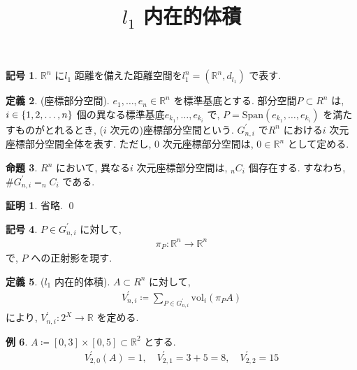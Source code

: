 \documentclass[10pt, fleqn, label-section=none]{bxjsarticle}
\title{$l_1$ 内在的体積}
\date{}
\author{}
\theoremstyle{definition}
\newtheorem{dfn}{定義}[section]
\newtheorem{ex}[dfn]{例}
\newtheorem{prop}[dfn]{命題}
\newtheorem{notation}[dfn]{記号}
\newtheorem*{pf*}{証明}
\newcommand{\cbra}[1]{\mleft\{#1\mright\}}
\newcommand{\vol}{\textrm{vol}}
\renewcommand{\;}{\, ; \,}
\newcommand{\Span}{\textrm{Span}}
\begin{document}
\maketitle

\section{}

\begin{notation}$\mathbb R^n$ に$l_1$ 距離を備えた距離空間を$l^n_1 = (\mathbb R^n, d_{l_1})$ で表す. 

\end{notation}

\begin{dfn}(座標部分空間). $e_1, \ldots, e_n \in \mathbb R^n$ を標準基底とする. 部分空間$P \subset R^n$ は, $i \in \cbra{1, 2, \ldots, n}$ 個の異なる標準基底$e_{k_1} , \ldots , e_{k_i}$ で, $P = \Span (e_{k_1} , \ldots , e_{k_i}) $ を満たすものがとれるとき, ($i$ 次元の)座標部分空間という. $G^\prime _{n, i}$ で$R^n$ における$i$ 次元座標部分空間全体を表す. ただし, $0$ 次元座標部分空間は, $0 \in \mathbb R^n$ として定める. 
\end{dfn}

\begin{prop}$R^n$ において, 異なる$i$ 次元座標部分空間は, $_nC_i$ 個存在する. すなわち, $\# G^\prime_{n,i} = _n C _i$ である.  

\end{prop}
\begin{pf*}
省略. 
\qed
\end{pf*}

\begin{notation}$P \in G^\prime _{n,i }$ に対して, 
\begin{align*} \pi_P : \mathbb R^n \rightarrow \mathbb R^n \end{align*}
で, $P$ への正射影を現す. 
\end{notation}

\begin{dfn}($l_1$ 内在的体積). $A \subset R^n$ に対して, 
\begin{align*} V^\prime_{n, i} \coloneqq \sum_{P \in G^\prime_{n, i}} \vol_i (\pi_P A) \end{align*}
により, $V^\prime_{n, i }     :   2^X \rightarrow \mathbb R$ を定める. 
\end{dfn}

\begin{ex}$A \coloneqq [0,3] \times [0, 5] \subset \mathbb R^2$ とする. 
\begin{align*} V^\prime_{2, 0} (A) = 1, \quad V^\prime_{2, 1} = 3 + 5 = 8, \quad V^\prime_{2, 2} = 15  \end{align*}
\end{ex}
\end{document}
